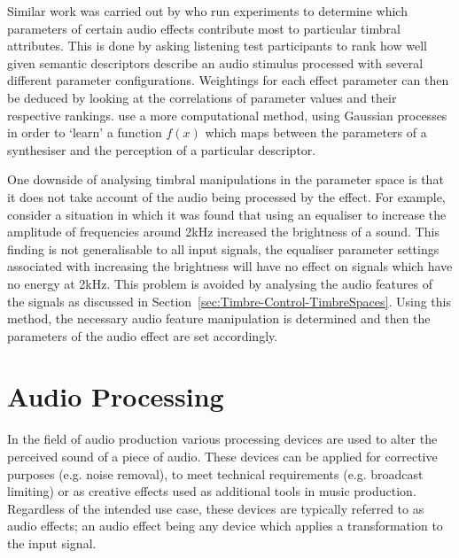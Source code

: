 		Similar work was carried out by \citet{sabin2011weighting} who run experiments to determine which
		parameters of certain audio effects contribute most to particular timbral attributes. This is done by
		asking listening test participants to rank how well given semantic descriptors describe an audio stimulus
		processed with several different parameter configurations. Weightings for each effect parameter can then be
		deduced by looking at the correlations of parameter values and their respective rankings.
		\citet{huang2014active} use a more computational method, using Gaussian processes in order to `learn' a
		function $f(x)$ which maps between the parameters of a synthesiser and the perception of a particular
		descriptor.

		One downside of analysing timbral manipulations in the parameter space is that it does not take account of
		the audio being processed by the effect. For example, consider a situation in which it was found that using
		an equaliser to increase the amplitude of frequencies around 2kHz increased the brightness of a sound. This
		finding is not generalisable to all input signals, the equaliser parameter settings associated with
		increasing the brightness will have no effect on signals which have no energy at 2kHz. This problem is
		avoided by analysing the audio features of the signals as discussed in
		Section~\ref{sec:Timbre-Control-TimbreSpaces}. Using this method, the necessary audio feature manipulation
		is determined and then the parameters of the audio effect are set accordingly.

\section{Audio Processing}
\label{sec:Timbre-AudioProcessing}
	In the field of audio production various processing devices are used to alter the perceived sound of a piece of
	audio. These devices can be applied for corrective purposes (e.g. noise removal), to meet technical requirements
	(e.g. broadcast limiting) or as creative effects used as additional tools in music production. Regardless of the
	intended use case, these devices are typically referred to as audio effects; an audio effect being any device which
	applies a transformation to the input signal.
	
